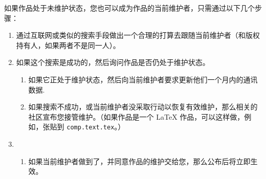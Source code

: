\begin{LPPLicense}
    如果作品处于未维护状态，您也可以成为作品的当前维护者，只需通过以下几个步骤：
    \begin{enumerate}
        \item 通过互联网或类似的搜索手段做出一个合理的打算去跟随当前维护者（和版权持有人，如果两者不是同一人）。
        \item 如果这个搜索是成功的，然后询问作品是否仍处于维护状态。
            \begin{enumerate}
                \item 如果它正处于维护状态，然后向当前维护者要求更新他们一个月内的通讯数据.
                \item\label{LPPL:item:intention} 如果搜索不成功，或当前维护者没采取行动以恢复有效维护，那么相关的社区宣布您接管维护。（如果作品是一个 \LaTeX{} 作品，可以这样做，例如，张贴到 \texttt{comp.text.tex}。）
            \end{enumerate}
        \item {}
            \begin{enumerate}
                \item 如果当前维护者做到了，并同意作品的维护交给您，那么公布后将立即生效。

\end{enumerate}
\end{enumerate}
\end{LPPLicense}
